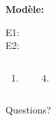 \documentclass{beamer}
\begin{document}
  \begin{frame}{}
    
    \begin{description}
      \item[\textbf{Modèle:}] \textit{}
      \item[E1:] 
      \item[E2:] 
    \end{description}
    \begin{columns}[t]
        \begin{enumerate}
          \item 
        \end{enumerate}
        \begin{enumerate}
          \setcounter{enumi}{3}
          \item 
        \end{enumerate}
    \end{columns}
  \end{frame}

  \begin{frame}{}
    \begin{center}
      \Large Questions?
    \end{center}
  \end{frame}
\end{document}
